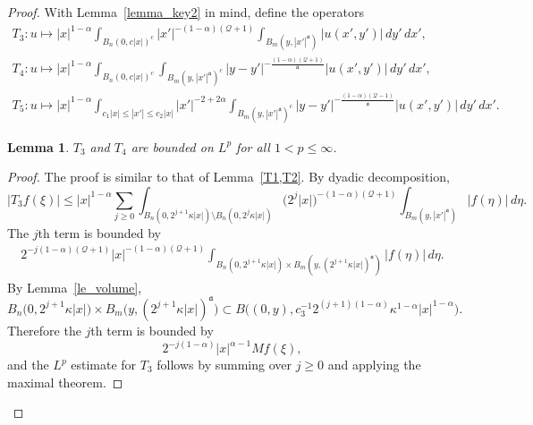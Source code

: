 \documentclass[12pt]{amsart}
\newtheorem{lemma}[theorem]{Lemma}
\begin{document}
\begin{proof}
With Lemma~\ref{lemma_key2} in mind, define the operators
\begin{gather*}
    T_3: u \mapsto |x|^{1-\alpha} \int_{B_n(0,c|x|)^c} |x'|^{-(1-\alpha)(\mathcal{Q}+1)} \int_{B_m(y,|x'|^{\mathfrak a})} |u(x',y')| \, dy' \, dx',\\
    T_4: u \mapsto |x|^{1-\alpha} \int_{B_n(0,c|x|)^c} \int_{B_m(y,|x'|^{\mathfrak a})^c} |y-y'|^{-\frac{(1-\alpha)(\mathcal{Q}+1)}{\mathfrak a}}|u(x',y')| \, dy' \, dx',\\
    T_5: u \mapsto |x|^{1-\alpha} \int_{c_1|x|\le |x'|\le c_2|x|} |x'|^{-2+2\alpha} \int_{B_m(y,|x'|^{\mathfrak a})^c} |y-y'|^{-\frac{(1-\alpha)(\mathcal{Q}-1)}{\mathfrak a}}|u(x',y')| \, dy' \, dx'.
\end{gather*}

\begin{lemma}\label{T3T4}
$T_3$ and $T_4$ are bounded on $L^p$ for all $1<p\le \infty$.
\end{lemma}

\begin{proof}
The proof is similar to that of Lemma~\ref{T1,T2}. By dyadic decomposition,
\begin{equation*}
    |T_3 f(\xi)|\le |x|^{1-\alpha} \sum_{j\ge 0} \int_{B_n(0,2^{j+1}\kappa |x|) \setminus B_n(0, 2^j \kappa |x|)} \bigl(2^j |x| \bigr)^{-(1-\alpha)(\mathcal{Q}+1)} \int_{B_m(y,|x'|^{\mathfrak a})} |f(\eta)| \, d\eta.
\end{equation*}
The $j$th term is bounded by
\begin{align*}
    2^{-j(1-\alpha)(\mathcal{Q}+1)} |x|^{-(1-\alpha)(\mathcal{Q}+1)} \int_{ B_n(0, 2^{j+1}\kappa |x|) \times B_m (y, (2^{j+1}\kappa |x|)^{\mathfrak a}) } |f(\eta)| \, d\eta.
\end{align*}
By Lemma~\ref{le_volume},
\begin{equation*}
    B_n\bigl(0, 2^{j+1}\kappa |x|\bigr) \times B_m \bigl(y, (2^{j+1}\kappa |x|)^{\mathfrak a}\bigr) \subset  B\bigl( (0,y), c_3^{-1} 2^{(j+1)(1-\alpha)} \kappa^{1-\alpha} |x|^{1-\alpha} \bigr).
\end{equation*}
Therefore the $j$th term is bounded by
\begin{equation*}
    2^{-j(1-\alpha)} |x|^{\alpha-1} Mf(\xi),
\end{equation*}
and the $L^p$ estimate for $T_3$ follows by summing over $j\ge 0$ and applying the maximal theorem.


\end{proof}
\end{proof}
\end{document}
